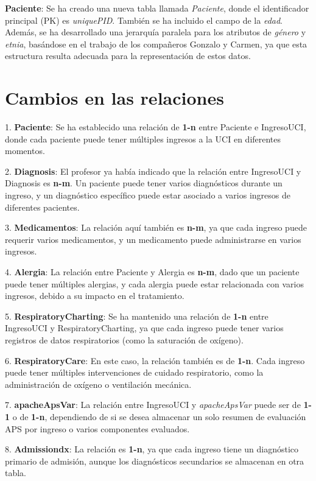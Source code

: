 \documentclass[12pt, a4paper, twoside]{article}
\begin{document}
	\textbf{Paciente}: Se ha creado una nueva tabla llamada \textit{Paciente}, donde el identificador principal (PK) es \textit{uniquePID}. También se ha incluido el campo de la \textit{edad}. Además, se ha desarrollado una jerarquía paralela para los atributos de \textit{género} y \textit{etnia}, basándose en el trabajo de los compañeros Gonzalo y Carmen, ya que esta estructura resulta adecuada para la representación de estos datos.
	
	\section*{Cambios en las relaciones}
	
	1. \textbf{Paciente}: Se ha establecido una relación de \textbf{1-n} entre Paciente e IngresoUCI, donde cada paciente puede tener múltiples ingresos a la UCI en diferentes momentos.
	
	2. \textbf{Diagnosis}: El profesor ya había indicado que la relación entre IngresoUCI y Diagnosis es \textbf{n-m}. Un paciente puede tener varios diagnósticos durante un ingreso, y un diagnóstico específico puede estar asociado a varios ingresos de diferentes pacientes.
	
	3. \textbf{Medicamentos}: La relación aquí también es \textbf{n-m}, ya que cada ingreso puede requerir varios medicamentos, y un medicamento puede administrarse en varios ingresos.
	
	4. \textbf{Alergia}: La relación entre Paciente y Alergia es \textbf{n-m}, dado que un paciente puede tener múltiples alergias, y cada alergia puede estar relacionada con varios ingresos, debido a su impacto en el tratamiento.
	
	5. \textbf{RespiratoryCharting}: Se ha mantenido una relación de \textbf{1-n} entre IngresoUCI y RespiratoryCharting, ya que cada ingreso puede tener varios registros de datos respiratorios (como la saturación de oxígeno).
	
	6. \textbf{RespiratoryCare}: En este caso, la relación también es de \textbf{1-n}. Cada ingreso puede tener múltiples intervenciones de cuidado respiratorio, como la administración de oxígeno o ventilación mecánica.
	
	7. \textbf{apacheApsVar}: La relación entre IngresoUCI y \textit{apacheApsVar} puede ser de \textbf{1-1} o de \textbf{1-n}, dependiendo de si se desea almacenar un solo resumen de evaluación APS por ingreso o varios componentes evaluados.
	
	8. \textbf{Admissiondx}: La relación es \textbf{1-n}, ya que cada ingreso tiene un diagnóstico primario de admisión, aunque los diagnósticos secundarios se almacenan en otra tabla.
	
\end{document}
